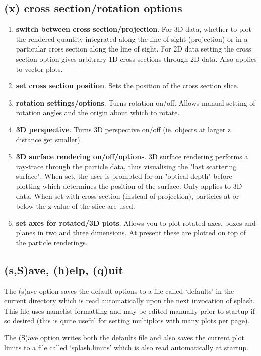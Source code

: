 \documentclass[a4paper,11pt]{article}
\begin{document}
\subsection{(x) cross section/rotation options}
\begin{enumerate}
\item \textbf{switch between cross section/projection}. For 3D data, whether to
plot the rendered quantity integrated along the line of sight (projection) or in
a particular cross section along the line of sight. For 2D data setting the
cross section option gives arbitrary 1D cross sections through 2D data. Also applies to vector plots.
\item \textbf{set cross section position}. Sets the position of the cross section slice.
\item \textbf{rotation settings/options}. Turns rotation on/off. Allows manual setting of rotation
angles and the origin about which to rotate.
\item \textbf{3D perspective}. Turns 3D perspective on/off (ie. objects at larger z distance get
smaller).
\item \textbf{3D surface rendering on/off/options}. 3D surface rendering performs a ray-trace through
the particle data, thus visualising the "last scattering surface". When set, the user is prompted for
an "optical depth" before plotting which determines the position of the surface. Only applies to 3D
data. When set with cross-section (instead of projection), particles at or below the z value of the
slice are used.
\item \textbf{set axes for rotated/3D plots}. Allows you to plot rotated axes, boxes and planes
in two and three dimensions. At present these are plotted on top of the particle renderings.
\end{enumerate}

\subsection{(s,S)ave, (h)elp, (q)uit}
 The (s)ave option saves the default options to a file called `defaults' in the
current directory which is read automatically upon the next invocation of
splash. This file uses namelist formatting and may be edited manually prior to  
startup if so desired (this is quite useful for setting multiplots with many plots per
 page).
 
  The (S)ave option writes both the defaults file and also saves the current plot
limits to a file called `splash.limits' which is also read automatically
at startup.
\end{document}
